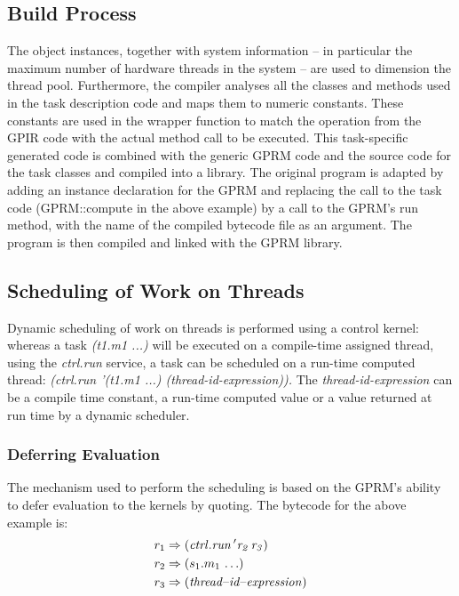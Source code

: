 \documentclass[copyright,creativecommons]{eptcs}
\begin{document}
\subsection{Build Process}

The object instances, together with system information -- in particular
the maximum number of hardware threads in the system -- are used to
dimension the thread pool. Furthermore, the compiler analyses all
the classes and methods used in the task description code and maps
them to numeric constants. These constants are used in the wrapper
function to match the operation from the GPIR code with the actual
method call to be executed. This task-specific generated code is combined
with the generic GPRM code and the source code for the task classes
and compiled into a library. The original program is adapted by adding
an instance declaration for the GPRM and replacing the call to the
task code (GPRM::compute in the above example) by a call to the GPRM's
run method, with the name of the compiled bytecode file as an argument.
The program is then compiled and linked with the GPRM library. 


\subsection{Scheduling of Work on Threads }

Dynamic scheduling of work on threads is performed using a control
kernel: whereas a task \emph{(t1.m1 ...) }will be executed on a compile-time
assigned thread, using the \emph{ctrl.run} service, a task can be
scheduled on a run-time computed thread: \emph{(ctrl.run '(t1.m1 ...)
(thread-id-expression)).} The \emph{thread-id-expression }can be a
compile time constant, a run-time computed value or a value returned
at run time by a dynamic scheduler.


\subsubsection{Deferring Evaluation}

The mechanism used to perform the scheduling is based on the GPRM's
ability to defer evaluation to the kernels by quoting. The bytecode
for the above example is:
\begin{align*}
r_{1} & \Rightarrow({\it ctrl.run\,'r_{2}\, r_{3})}\\
r_{2} & \Rightarrow(s_{1}.m_{1}\,\ldots)\\
r_{3} & \Rightarrow({\it thread\text{–}id\text{–}expression})
\end{align*}
\end{document}
